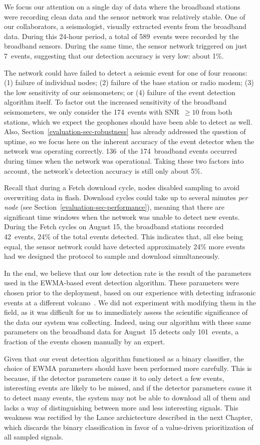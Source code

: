 We focus our attention on a single day of data where the broadband stations
were recording clean data and the sensor network was relatively stable. One
of our collaborators, a seismologist, visually extracted events from the
broadband data. During this 24-hour period, a total of 589~events were
recorded by the broadband sensors. During the same time, the sensor network
triggered on just 7~events, suggesting that our detection accuracy is very
low: about 1\%.

The network could have failed to detect a seismic event for one of four
reasons: (1) failure of individual nodes; (2) failure of the base station or
radio modem; (3) the low sensitivity of our seismometers; or (4) failure of
the event detection algorithm itself. To factor out the increased sensitivity
of the broadband seismometers, we only consider the 174~events with SNR~$\geq
10$ from both stations, which we expect the geophones should have been able
to detect as well. Also, Section~\ref{evaluation-sec-robustness} has already
addressed the question of uptime, so we focus here on the inherent accuracy
of the event detector when the network was operating correctly. 136~of the
174~broadband events occurred during times when the network was operational.
Taking these two factors into account, the network's detection accuracy is
still only about 5\%. 

Recall that during a Fetch download cycle, nodes disabled sampling to avoid
overwriting data in flash. Download cycles could take up to several minutes
\textit{per node} (see Section~\ref{evaluation-sec-performance}), meaning
that there are significant time windows when the network was unable to detect
new events. During the Fetch cycles on August 15, the broadband stations
recorded 42~events, 24\% of the total events detected. This indicates that,
all else being equal, the sensor network could have detected approximately
24\% more events had we designed the protocol to sample and download
simultaneously. 

In the end, we believe that our low detection rate is the result of the
parameters used in the EWMA-based event detection algorithm. These parameters
were chosen prior to the deployment, based on our experience with detecting
infrasonic events at a different volcano~\cite{volcano-ewsn05}. We did not
experiment with modifying them in the field, as it was difficult for us to
immediately assess the scientific significance of the data our system was
collecting. Indeed, using our algorithm with these same parameters on the
broadband data for August~15 detects only 101~events, a fraction of the
events chosen manually by an expert. 

Given that our event detection algorithm functioned as a binary classifier,
the choice of EWMA parameters should have been performed more carefully. This
is because, if the detector parameters cause it to only detect a few events,
interesting events are likely to be missed, and if the detector parameters
cause it to detect many events, the system may not be able to download all of
them and lacks a way of distinguishing between more and less interesting
signals. This weakness was rectified by the Lance archictecture described in
the next Chapter, which discards the binary classification in favor of a
value-driven prioritization of all sampled signals.
